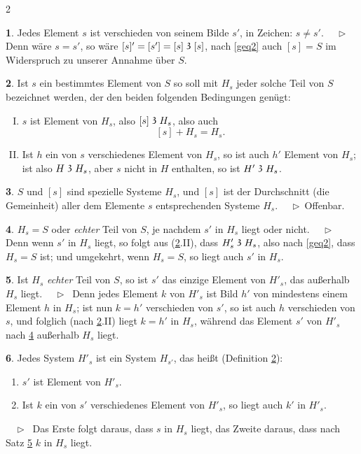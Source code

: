 \documentclass[leqno,hidelinks,10pt]{article}
\theoremstyle{definition}
\newtheorem{satz}{\protect\satzname}
\newtheorem{deff}[satz]{\protect\deffname}
\newcommand{\satzname}{}
\newcommand{\deffname}{}
\renewcommand{\satzname}{\hspace{-4pt}.\ Satz}%
\renewcommand{\deffname}{\hspace{-4pt}.\ Definition}%
\renewcommand{\satzname}{\hspace{-4pt}.\ Theorem}%
\renewcommand{\deffname}{\hspace{-4pt}.\ Definition}%
\newcommand\Beweis{\medskip \newline $ \phantom{'.'} \rhd \ $}%
\newcommand\beweis{ $ \phantom{'.'} \rhd \ $}%
\newcommand\TeilVon{\mathrel{\raisebox{0.45ex}{$\mathfrak{3}$}}}
\newcommand{\sref}[1]{\underline{\ref{#1}}}%
\begin{document}
\begin{paracol}{2}
\begin{leftcolumn}
\begin{satz}\label{gthm2}
Jedes Element $s$ ist verschieden von seinem Bilde $s'$, in Zeichen: $s \neq s'$.
\Beweis
Denn wäre $s = s'$, so wäre $[s]' = [s'] = [s] \TeilVon [s]$, nach \eqref{geq2}
auch $[s] = S$ im Widerspruch zu unserer Annahme über $S$.
\end{satz}

\newpage

\begin{deff}\label{gdef3}
Ist $s$ ein bestimmtes Element von $S$ so soll mit $H_s$ jeder solche Teil von
$S$ bezeichnet werden, der den beiden folgenden Bedingungen genügt:
\begin{enumerate}[I.]
\item $s$ ist Element von $H_s$, also $[s] \TeilVon H_s$, also auch
\[
	[s] + H_s = H_s.
\]
\item Ist $h$ ein von $s$ verschiedenes Element von $H_s$, so ist auch $h'$
Element von $H_s$; ist also $H \TeilVon H_s$, aber $s$ nicht in $H$ enthalten,
so ist $H' \TeilVon H_s$.
\end{enumerate}
\end{deff}

\begin{satz}\label{gthm4}
$S$ und $[s]$ sind spezielle Systeme $H_s$, und $[s]$ ist der Durchschnitt
(die Gemeinheit) aller dem Elemente $s$ entsprechenden Systeme $H_s$.
\Beweis Offenbar.
\end{satz}

\begin{satz}\label{gthm5}
$H_s = S$ oder \textit{echter} Teil von $S$, je nachdem $s'$ in $H_s$ liegt oder nicht.
\Beweis
Denn wenn $s'$ in $H_s$ liegt, so folgt aus (\sref{gdef3}.II),
dass $H'_s \TeilVon H_s$, also nach \eqref{geq2}, dass $H_s = S$ ist; und umgekehrt,
wenn $H_s = S$, so liegt auch $s'$ in $H_s$.
\end{satz}

\begin{satz}\label{gthm6}
Ist $H_s$ \emph{echter} Teil von $S$, so ist $s'$ das einzige Element von $H'_s$,
das außerhalb $H_s$ liegt.
\Beweis
Denn jedes Element $k$ von $H'_s$ ist Bild $h'$ von mindestens einem Element $h$
in $H_s$; ist nun $k=h'$ verschieden von $s'$, so ist auch $h$ verschieden von $s$,
und folglich (nach \sref{gdef3}.II) liegt $k = h'$ in $H_s$,
während das Element $s'$ von $H'_s$ nach \sref{gthm5} außerhalb $H_s$ liegt.
\end{satz}

\begin{satz}\label{gthm7}
Jedes System $H'_s$ ist ein System $H_{s'}$, das heißt (Definition \sref{gdef3}):
\begin{enumerate}[I$'$.]
    \item $s'$ ist Element von $H'_s$.
    \item Ist $k$ ein von $s'$ verschiedenes Element von $H'_s$, so liegt auch $k'$ in $H'_s$.
\end{enumerate}
\beweis
Das Erste folgt daraus, dass $s$ in $H_s$ liegt, das Zweite daraus,
dass nach Satz \sref{gthm6} $k$ in $H_s$ liegt.
\end{satz}


\end{leftcolumn}
\end{paracol}
\end{document}

